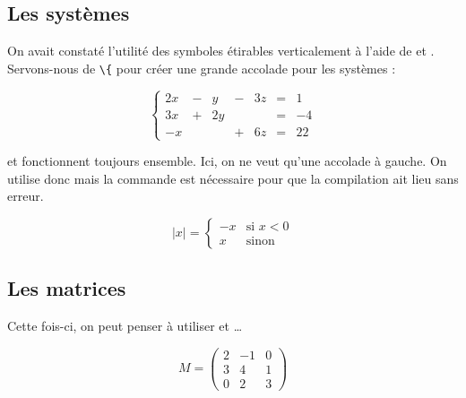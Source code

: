 \subsection{Les systèmes}

On avait constaté l'utilité des symboles étirables verticalement à l'aide de  et . Servons-nous de \verb!\{! pour créer une grande accolade pour les systèmes :\bigskip

{\NewFont
\begin{SideBySideExample}
    \[\left\{
    	\begin{array}{ccccccl}
    		2x & - & y & - & 3z & = & 1 \\
    		3x & + & 2y &  &  & = & -4 \\
    		-x &  &  & + & 6z & = & 22
    	\end{array}
    \right.\]
\end{SideBySideExample}
}\bigskip

\begin{info}
     et  fonctionnent toujours ensemble. Ici, on ne veut qu'une accolade à gauche. On utilise donc  mais la commande  est nécessaire pour que la compilation ait lieu sans erreur.
\end{info}

{\NewFont
\begin{SideBySideExample}
    \[\lvert x \rvert =
    \left\{
    	\begin{array}{cl}
    		-x & \text{si } x < 0 \\
    		x & \text{sinon}
    	\end{array}
    \right.\]
\end{SideBySideExample}
}\bigskip

\subsection{Les matrices}

Cette fois-ci, on peut penser à utiliser  et \dots\bigskip

{\NewFont
\begin{SideBySideExample}
    \[M = \left(
    	\begin{array}{ccc}
    		2 & -1 & 0 \\
            3 & 4 & 1 \\
            0 & 2 & 3
    	\end{array}
    \right)\]
\end{SideBySideExample}
}\bigskip

